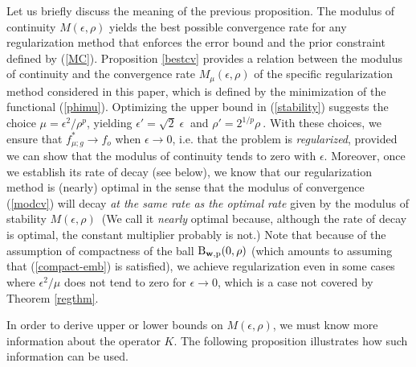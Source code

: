 \documentclass[10pt]{article}
\newcommand\eref[1]{(\ref{#1})}
\begin{document}
\bigskip

Let us briefly discuss the meaning of the previous proposition.
The modulus of continuity $M(\epsilon,\rho)$ yields the best possible
convergence rate for any
regularization method that enforces the error bound and the prior
constraint defined by \eref{MC}.
Proposition \ref{bestcv} provides a relation between the modulus of
continuity and  the convergence rate $M_\mu(\epsilon,\rho)$ of the
specific regularization method considered in this paper, which
is defined by the minimization of the functional \eref{phimu}. Optimizing
the upper bound
in  \eref{stability} suggests the choice
$\mu=\epsilon^2/\rho^p$, yielding
$\epsilon'=\sqrt{2}\;\epsilon\ $ and $\rho'=2^{1/p}\rho\ $.  With these
choices,
we ensure that $f^*_{\mu;g} \rightarrow f_o$ when $\epsilon
\rightarrow 0$, i.e.
that the problem is {\it regularized}, provided we can show
that the modulus of continuity
tends to zero with $\epsilon$.
 Moreover, once we establish its rate of
decay (see below), we know that our regularization method is (nearly)
optimal in the sense that the modulus of convergence (\ref{modcv}) will decay
{\em at the same rate as the optimal rate} given by the modulus of stability
$M(\epsilon,\rho)$\ (We call it {\em nearly} optimal because, although the
rate of
decay is optimal, the constant multiplier probably is not.)
Note that because of the assumption of compactness of
the ball $\rm{B}_{\mathbf{w},p}(0,\rho)$ (which amounts to assuming that
\eref{compact-emb} is satisfied), we achieve regularization
even in some cases where $\epsilon^2 / \mu$
does not tend to zero for $\epsilon \to 0$, which is a case not covered by
Theorem \ref{regthm}.

In order to derive upper or lower bounds on $M(\epsilon,\rho)$, we must
know more information about the operator $K$. The following proposition
illustrates how such information can be used.
\end{document}
